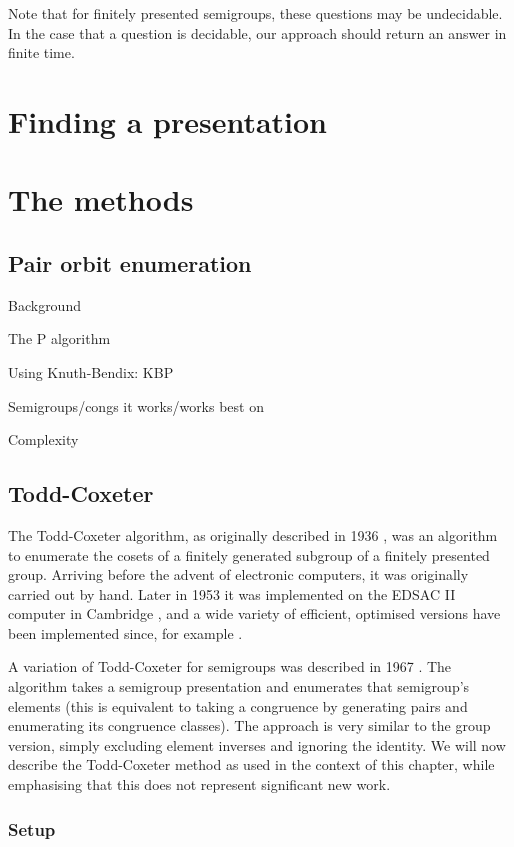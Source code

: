 Note that for finitely presented semigroups, these questions may be
undecidable.  In the case that a question is decidable, our approach should
return an answer in finite time.

\section{Finding a presentation}

\section{The methods}

\subsection{Pair orbit enumeration}
\label{sec:p}

Background

The P algorithm

Using Knuth-Bendix: KBP

Semigroups/congs it works/works best on

Complexity

\subsection{Todd-Coxeter}
\label{sec:tc}

The Todd-Coxeter algorithm, as originally described in 1936
\cite{todd_coxeter_1936}, was an algorithm to enumerate the cosets of a finitely
generated subgroup of a finitely presented group.  Arriving before the advent of
electronic computers, it was originally carried out by hand.  Later in 1953 it
was implemented on the EDSAC II computer in Cambridge \cite{leech_1963}, and a
wide variety of efficient, optimised versions have been implemented since, for
example \cite{ace}.

A variation of Todd-Coxeter for semigroups was described in 1967
\cite{neumann_1967}.  The algorithm takes a semigroup presentation and
enumerates that semigroup's elements (this is equivalent to taking a congruence
by generating pairs and enumerating its congruence classes).  The approach is
very similar to the group version, simply excluding element inverses and
ignoring the identity.  We will now describe the Todd-Coxeter method as used in
the context of this chapter, while emphasising that this does not represent
significant new work.

\subsubsection{Setup}

